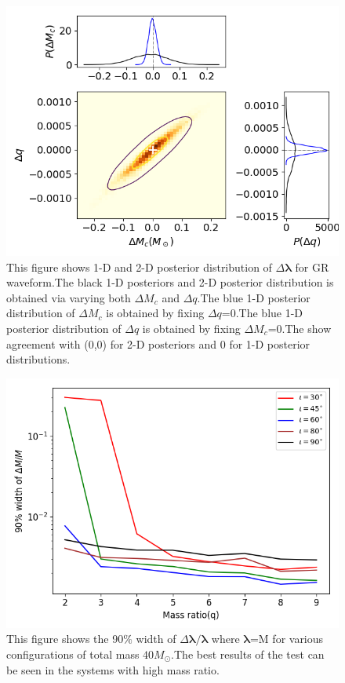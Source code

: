 \documentclass[prd,preprintnumbers,twocolumn,eqsecnum,floatfix,a4paper,nofootinbib,superscriptaddress]{revtex4}
\newcommand{\blambda}{\bm{\lambda}}
\begin{document}
\begin{figure}[h]
	\includegraphics*[scale=0.5]{./../../plots/triangle_plot_gr}
	\caption{This figure shows 1-D and 2-D posterior distribution of $\Delta \blambda$ for GR waveform.The black 1-D posteriors and 2-D posterior distribution is obtained via varying both $\Delta M_c$ and $\Delta q$.The blue 1-D posterior distribution of $\Delta M_c$  is obtained by fixing $\Delta q$=0.The blue 1-D posterior distribution of $\Delta q$  is obtained by fixing $\Delta M_c$=0.The show agreement with (0,0) for 2-D posteriors and 0 for 1-D posterior distributions.}
\end{figure}


\begin{figure}[h]
	\includegraphics*[scale=0.5]{./../../plots/90_percent_width_dM}
	\caption{This figure shows the 90$\%$ width of $\Delta \blambda/\blambda$ where $\blambda$=M for various configurations of total mass $40M_{\odot}$.The best results of the test can be seen in the systems with high mass ratio.}
\end{figure}
\end{document}
